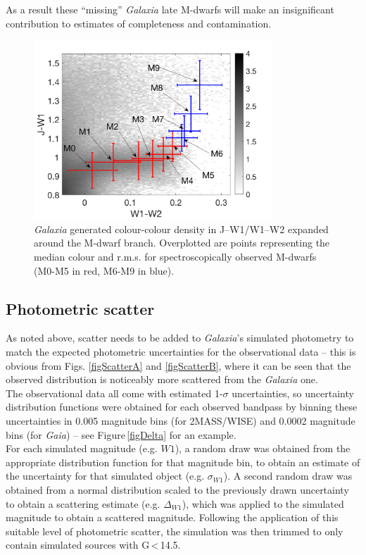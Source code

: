 As a result these ``missing'' {\em Galaxia} late M-dwarfs will make an insignificant contribution to estimates of completeness and contamination.\\

\begin{figure}[!ht]
	\centering
	\includegraphics[width=0.8\textwidth]{Subtypes-2.png}
    \caption{{\em Galaxia} generated colour-colour density in J--W1/W1--W2 expanded around the M-dwarf branch. Overplotted are points representing the median colour and r.m.s. for spectroscopically observed M-dwarfs (M0-M5 in red, M6-M9 in blue).}
    \label{figSubtypes}
\end{figure}
\subsection{Photometric scatter}
\label{Scattering}
As noted above, scatter needs to be added to  {\em Galaxia}'s simulated photometry to match the expected photometric uncertainties for the observational data -- this is obvious from Figs. \ref{figScatterA} and \ref{figScatterB}, where it can be seen that the observed distribution is noticeably more scattered from the {\em Galaxia} one.\\

The observational data all come with estimated 1-$\sigma$ uncertainties, so uncertainty distribution functions were obtained for each observed bandpass by binning these uncertainties in 0.005 magnitude bins (for 2MASS/WISE) and 0.0002 magnitude bins (for {\em Gaia}) -- see Figure\,\ref{figDelta} for an example. \\

For each simulated magnitude (e.g. $W1$), a random draw was obtained from the appropriate distribution function for that magnitude bin, to obtain an estimate of the uncertainty for that simulated object (e.g. $\sigma_{W1}$). A second random draw was obtained from a normal distribution scaled to the previously drawn uncertainty to obtain a scattering estimate (e.g. $\Delta_{W1}$), which was applied to the simulated magnitude to obtain a scattered magnitude. Following the application of this suitable level of photometric scatter, the simulation was then trimmed to only contain simulated sources with G\,\textless\,14.5.\\

